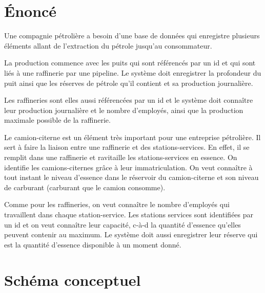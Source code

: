 \documentclass[a4paper]{article}
\begin{document}
\let\cleardoublepage\clearpage















\section{Énoncé}





Une compagnie pétrolière a besoin d'une base de données qui enregistre plusieurs éléments allant de l'extraction du pétrole jusqu'au consommateur.

La production commence avec les puits qui sont référencés par un id et qui sont liés à une raffinerie par une pipeline. Le système doit enregistrer la profondeur du puit ainsi que les réserves de pétrole qu'il contient et sa production journalière.

Les raffineries sont elles aussi référencées par un id et le système doit connaître leur production journalière et le nombre d'employés, ainsi que la production maximale possible de la raffinerie.

Le camion-citerne est un élément très important pour une entreprise pétrolière. Il sert à faire la liaison entre une raffinerie et des stations-services. En effet, il se remplit dans une raffinerie et ravitaille les stations-services en essence. On identifie les camions-citernes grâce à leur immatriculation. On veut connaître à tout instant le niveau d'essence dans le réservoir du camion-citerne et son niveau de carburant (carburant que le camion consomme).

Comme pour les raffineries, on veut connaître le nombre d'employés qui travaillent dans chaque station-service. Les stations services sont identifiées par un id et on veut connaître leur capacité, c-à-d la quantité d'essence qu'elles peuvent contenir au maximum. Le système doit aussi enregistrer leur réserve qui est la quantité d'essence disponible à un moment donné.















\section{Schéma conceptuel}
\end{document}
